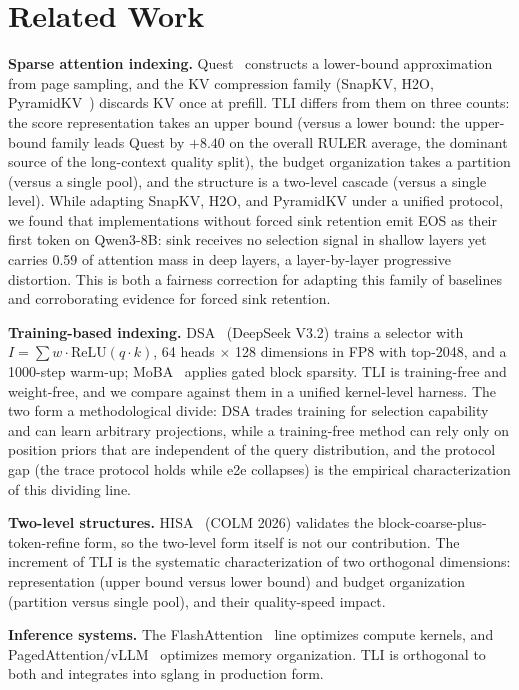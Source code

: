 \documentclass[11pt]{article}
\begin{document}
\section{Related Work}

\textbf{Sparse attention indexing.} Quest~\cite{quest} constructs a lower-bound approximation from page sampling, and the KV compression family (SnapKV, H2O, PyramidKV~\cite{snapkv,h2o,pyramidkv}) discards KV once at prefill. TLI differs from them on three counts: the score representation takes an upper bound (versus a lower bound: the upper-bound family leads Quest by $+8.40$ on the overall RULER average, the dominant source of the long-context quality split), the budget organization takes a partition (versus a single pool), and the structure is a two-level cascade (versus a single level). While adapting SnapKV, H2O, and PyramidKV under a unified protocol, we found that implementations without forced sink retention emit EOS as their first token on Qwen3-8B: sink receives no selection signal in shallow layers yet carries 0.59 of attention mass in deep layers, a layer-by-layer progressive distortion. This is both a fairness correction for adapting this family of baselines and corroborating evidence for forced sink retention.

\textbf{Training-based indexing.} DSA~\cite{dsa} (DeepSeek V3.2) trains a selector with $I=\sum w\cdot\mathrm{ReLU}(q\cdot k)$, 64 heads $\times$ 128 dimensions in FP8 with top-2048, and a 1000-step warm-up; MoBA~\cite{moba} applies gated block sparsity. TLI is training-free and weight-free, and we compare against them in a unified kernel-level harness. The two form a methodological divide: DSA trades training for selection capability and can learn arbitrary projections, while a training-free method can rely only on position priors that are independent of the query distribution, and the protocol gap (the trace protocol holds while e2e collapses) is the empirical characterization of this dividing line.

\textbf{Two-level structures.} HISA~\cite{hisa} (COLM 2026) validates the block-coarse-plus-token-refine form, so the two-level form itself is not our contribution. The increment of TLI is the systematic characterization of two orthogonal dimensions: representation (upper bound versus lower bound) and budget organization (partition versus single pool), and their quality-speed impact.

\textbf{Inference systems.} The FlashAttention~\cite{fa} line optimizes compute kernels, and PagedAttention/vLLM~\cite{vllm} optimizes memory organization. TLI is orthogonal to both and integrates into sglang in production form.
\end{document}
